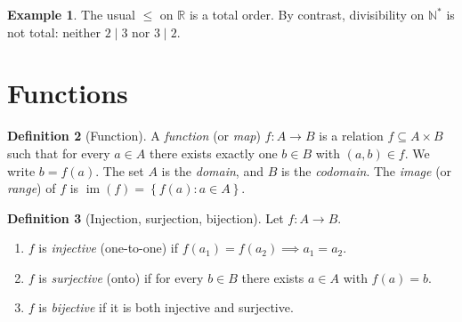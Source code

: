 \documentclass[12pt,a4paper,openany]{book}
\theoremstyle{definition}
\newtheorem{definition}{Definition}[chapter]
\newtheorem{example}[definition]{Example}
\theoremstyle{plain}
\theoremstyle{remark}
\newcommand{\N}{\mathbb{N}}
\newcommand{\R}{\mathbb{R}}
\newcommand{\set}[1]{\left\{#1\right\}}
\begin{document}
\begin{example}\label{ex:usual-order-total}
The usual $\leq$ on $\R$ is a total order. By contrast, divisibility on
$\N^{*}$ is not total: neither $2 \mid 3$ nor $3 \mid 2$.
\end{example}

\section{Functions}
\label{sec:functions}

\begin{definition}[Function]\label{def:function}
A \emph{function} (or \emph{map}) $f\colon A \to B$ is a relation
$f \subseteq A \times B$ such that for every $a \in A$ there exists
exactly one $b \in B$ with $(a,b) \in f$. We write $b = f(a)$.
The set $A$ is the \emph{domain}, and $B$ is the \emph{codomain}.
The \emph{image} (or \emph{range}) of $f$ is
$\operatorname{im}(f) = \set{f(a) : a \in A}$.
\end{definition}

\begin{definition}[Injection, surjection, bijection]\label{def:inj-surj-bij}
Let $f\colon A \to B$.
\begin{enumerate}[label=(\roman*)]
  \item $f$ is \emph{injective} (one-to-one) if
        $f(a_1) = f(a_2) \implies a_1 = a_2$.
  \item $f$ is \emph{surjective} (onto) if for every $b \in B$ there exists
        $a \in A$ with $f(a) = b$.
  \item $f$ is \emph{bijective} if it is both injective and surjective.
\end{enumerate}
\end{definition}
\end{document}
